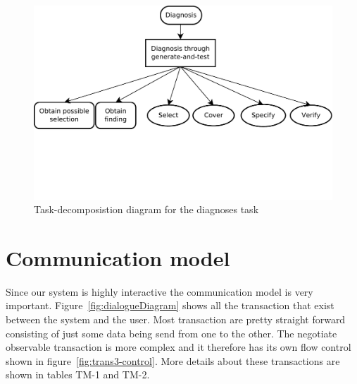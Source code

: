 \documentclass[a4paper,10pt]{article}
\begin{document}
\begin{figure}[htbp]
	\centering
		\includegraphics[width=1.00\textwidth, trim = 0 130 0 0, clip = true]{taskDecomposition.pdf}
	\caption{Task-decomposistion diagram for the diagnoses task}
	\label{fig:taskDecomposition}
\end{figure}


\section{Communication model}
Since our system is highly interactive the communication model is very important. Figure~\ref{fig:dialogueDiagram} shows all the transaction that exist between the system and the user. Most transaction are pretty straight forward consisting of just some data being send from one to the other. The negotiate observable transaction is more complex and it therefore has its own flow control shown in figure~\ref{fig:trans3-control}. More details about these transactions are shown in tables TM-1 and TM-2.
\end{document}
